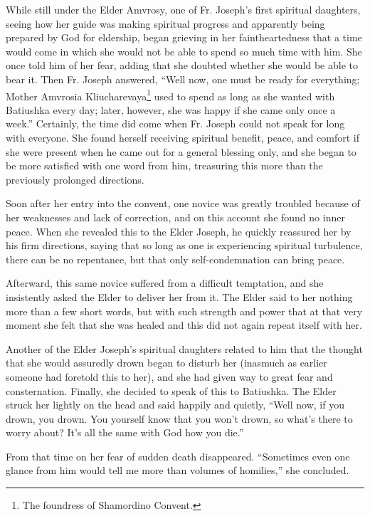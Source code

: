 While still under the Elder Amvrosy, one of Fr. Joseph's first spiritual daughters, seeing how her guide was making spiritual progress and apparently being prepared by God for eldership, began grieving in her faintheartedness that a time would come in which she would not be able to spend so much time with him. She once told him of her fear, adding that she doubted whether she would be able to bear it. Then Fr. Joseph answered, ``Well now, one must be ready for everything; Mother Amvrosia Kliucharevaya\footnote{The foundress of Shamordino Convent.} used to spend as long as she wanted with Batiushka every day; later, however, she was happy if she came only once a week.'' Certainly, the time did come when Fr. Joseph could not speak for long with everyone. She found herself receiving spiritual benefit, peace, and comfort if she were present when he came out for a general blessing only, and she began to be more satisfied with one word from him, treasuring this more than the previously prolonged directions.

Soon after her entry into the convent, one novice was greatly troubled because of her weaknesses and lack of correction, and on this account she found no inner peace. When she revealed this to the Elder Joseph, he quickly reassured her by his firm directions, saying that so long as one is experiencing spiritual turbulence, there can be no repentance, but that only self-condemnation can bring peace.

Afterward, this same novice suffered from a difficult temptation, and she insistently asked the Elder to deliver her from it. The Elder said to her nothing more than a few short words, but with such strength and power that at that very moment she felt that she was healed and this did not again repeat itself with her.

Another of the Elder Joseph's spiritual daughters related to him that the thought that she would assuredly drown began to disturb her (inasmuch as earlier someone had foretold this to her), and she had given way to great fear and consternation. Finally, she decided to speak of this to Batiushka. The Elder struck her lightly on the head and said happily and quietly, ``Well now, if you drown, you drown. You yourself know that you won't drown, so what's there to worry about? It's all the same with God how you die.''

From that time on her fear of sudden death disappeared. ``Sometimes even one glance from him would tell me more than volumes of homilies,'' she concluded.

